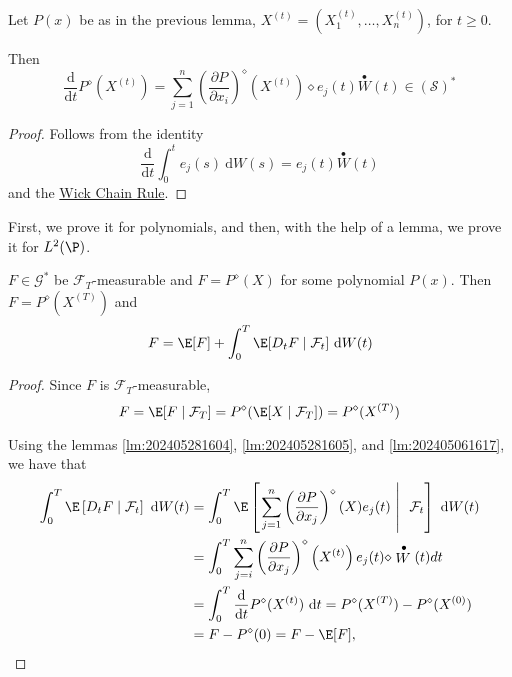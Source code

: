\begin{lemma}\label{lm:202405281605}
  Let $P(x)$ be as in the previous lemma, $X^{(t)} = (X_1^{(t)}, \ldots, X_n^{(t)})$, for $t \ge 0$.  

  Then 
  \[
    \frac{\mathrm{d}}{\mathrm{d}t} P^\diamond(X^{(t)}) = \sum_{j=1}^n \left( \frac{\partial P}{\partial x_i} \right)^\diamond (X^{(t)}) \diamond e_j(t) \stackrel{\bullet}{W}(t) \in (\mathcal{S})^\ast
  \]
\end{lemma}

\begin{proof}
  Follows from the identity
  \[
    \frac{\mathrm{d}}{\mathrm{d}t} \int_0^t e_j(s) ~\mathrm{d}W(s) = e_j(t) \stackrel{\bullet}{W}(t)
  \]
  and the \hyperref[thm:wick-chain]{Wick Chain Rule}.
\end{proof}

First, we prove it for polynomials, and then, with the help of a lemma, we prove it for $L^2(\P)$.

\begin{lemma}\label{lm:co-poly}
  $F \in \mathcal{G}^\ast$ be $\mathcal{F}_T$-measurable and $F = P^\diamond(X)$ for some polynomial $P(x)$. Then $F = P^\diamond(X^{(T)})$ and 
  \[
    F = \E[F] + \int_0^T \E [D_t F \mid \mathcal{F}_t] ~\mathrm{d}W(t)
  \]
\end{lemma}

\begin{proof}
  Since $F$ is $\mathcal{F}_T$-measurable, 
  \[
	F = \E [F \mid \mathcal{F}_T] = P^\diamond (\E [X \mid \mathcal{F}_T]) = P^\diamond (X^{(T)})  
  \]
  
  Using the lemmas \ref{lm:202405281604}, \ref{lm:202405281605}, and \ref{lm:202405061617}, 
  we have that 
  \begin{equation*}
\begin{aligned}
\int_0^T \E \left[D_t F \mid \mathcal{F}_t\right] ~\mathrm{d} W(t) & =\int_0^T \E \left[\left.\sum_{j=1}^n\left(\frac{\partial P}{\partial x_j}\right)^{\diamond}(X) e_j(t) ~\right\rvert\,~ \mathcal{F}_t\right] ~\mathrm{d} W(t) \\
& =\int_0^T \sum_{j=i}^n\left(\frac{\partial P}{\partial x_j}\right)^{\diamond}\left(X^{(t)}\right) e_j(t) \diamond \stackrel{\bullet}{W}(t) d t \\
& =\int_0^T \frac{\mathrm{d}}{\mathrm{d} t} P^{\diamond}(X^{(t)}) ~\mathrm{d} t = P^{\diamond}(X^{(T)})-P^{\diamond} (X^{(0)}) \\
& =F-P^{\diamond}(0)= F - \E [F],
\end{aligned}
\end{equation*}
  
\end{proof}

